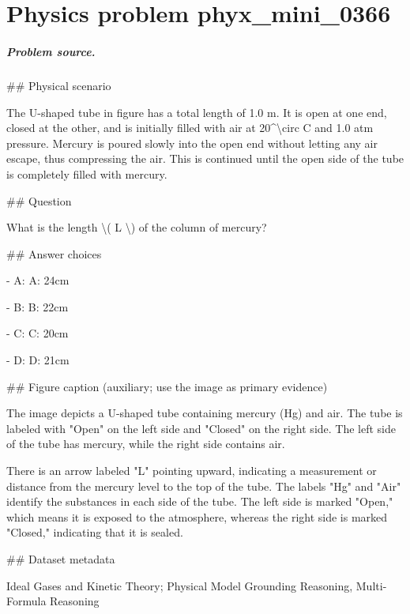 
\chapter{Physics problem phyx\_mini\_0366}
\label{ch:PhyXMiniProblems_problem_phyx_mini_0366}

\paragraph{Problem source.}
\#\# Physical scenario

The U-shaped tube in figure has a total length of 1.0 m. It is open at one end, closed at the other, and is initially filled with air at 20\textasciicircum{}\textbackslash{}circ C and 1.0 atm pressure. Mercury is poured slowly into the open end without letting any air escape, thus compressing the air. This is continued until the open side of the tube is completely filled with mercury.

\#\# Question

What is the length \textbackslash{}( L \textbackslash{}) of the column of mercury?

\#\# Answer choices

- A: A: 24cm

- B: B: 22cm

- C: C: 20cm

- D: D: 21cm

\#\# Figure caption (auxiliary; use the image as primary evidence)

The image depicts a U-shaped tube containing mercury (Hg) and air. The tube is labeled with "Open" on the left side and "Closed" on the right side. The left side of the tube has mercury, while the right side contains air. 

There is an arrow labeled "L" pointing upward, indicating a measurement or distance from the mercury level to the top of the tube. The labels "Hg" and "Air" identify the substances in each side of the tube. The left side is marked "Open," which means it is exposed to the atmosphere, whereas the right side is marked "Closed," indicating that it is sealed.

\#\# Dataset metadata

Ideal Gases and Kinetic Theory; Physical Model Grounding Reasoning, Multi-Formula Reasoning


